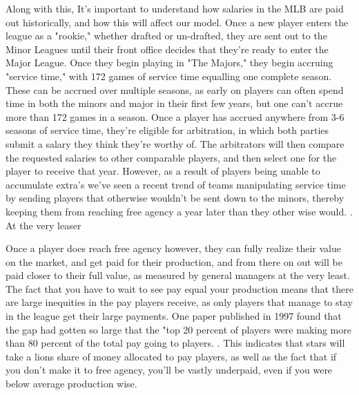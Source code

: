 \documentclass{article}
\begin{document}
Along with this, It's important to understand how salaries in the MLB are paid out historically, and how this will affect our model. Once a new player enters the league as a "rookie," whether drafted or un-drafted, they are sent out to the Minor Leagues until their front office decides that they're ready to enter the Major League. Once they begin playing in "The Majors," they begin accruing "service time," with 172 games of service time equalling one complete season. These can be accrued over multiple seasons, as early on players can often spend time in both the minors and major in their first few years, but one can't accrue more than 172 games in a season. \citet{perry2021MLB} Once a player has accrued anywhere from 3-6 seasons of service time, they're eligible for arbitration, in which both parties submit a salary they think they're worthy of. The arbitrators will then compare the requested salaries to other comparable players, and then select one for the player to receive that year. \citet{mlbarbitration} However, as a result of players being unable to accumulate extra's we've seen a recent trend of teams manipulating service time by sending players that otherwise wouldn't be sent down to the minors, thereby keeping them from reaching free agency a year later than they other wise would. \citet{perry2021MLB}. At the very leaser

Once a player does reach free agency however, they can fully realize their value on the market, and get paid for their production, and from there on out will be paid closer to their full value, as measured by general managers at the very least. The fact that you have to wait to see pay equal your production means that there are large inequities in the pay players receive, as only players that manage to stay in the league get their large payments. One paper published in 1997 found that the gap had gotten so large that the "top 20 percent of players were making more than 80 percent of the total pay going to players. \citet{staudohar1997structure}. This indicates that stars will take a lions share of money allocated to pay players, as well as the fact that if you don't make it to free agency, you'll be vastly underpaid, even if you were below average production wise.
\end{document}
